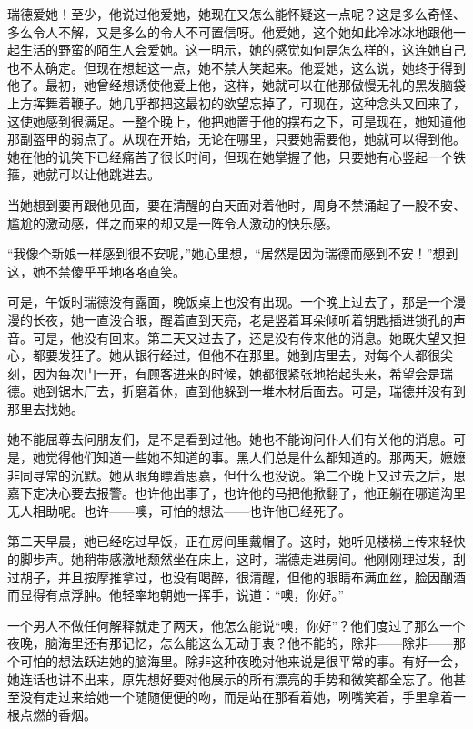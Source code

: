 \par 瑞德爱她！至少，他说过他爱她，她现在又怎么能怀疑这一点呢？这是多么奇怪、多么令人不解，又是多么的令人不可置信呀。他爱她，这个她如此冷冰冰地跟他一起生活的野蛮的陌生人会爱她。这一明示，她的感觉如何是怎么样的，这连她自己也不太确定。但现在想起这一点，她不禁大笑起来。他爱她，这么说，她终于得到他了。最初，她曾经想诱使他爱上他，这样，她就可以在他那傲慢无礼的黑发脑袋上方挥舞着鞭子。她几乎都把这最初的欲望忘掉了，可现在，这种念头又回来了，这使她感到很满足。一整个晚上，他把她置于他的摆布之下，可是现在，她知道他那副盔甲的弱点了。从现在开始，无论在哪里，只要她需要他，她就可以得到他。她在他的讥笑下已经痛苦了很长时间，但现在她掌握了他，只要她有心竖起一个铁箍，她就可以让他跳进去。
\par 当她想到要再跟他见面，要在清醒的白天面对着他时，周身不禁涌起了一股不安、尴尬的激动感，伴之而来的却又是一阵令人激动的快乐感。
\par “我像个新娘一样感到很不安呢，”她心里想，“居然是因为瑞德而感到不安！”想到这，她不禁傻乎乎地咯咯直笑。
\par 可是，午饭时瑞德没有露面，晚饭桌上也没有出现。一个晚上过去了，那是一个漫漫的长夜，她一直没合眼，醒着直到天亮，老是竖着耳朵倾听着钥匙插进锁孔的声音。可是，他没有回来。第二天又过去了，还是没有传来他的消息。她既失望又担心，都要发狂了。她从银行经过，但他不在那里。她到店里去，对每个人都很尖刻，因为每次门一开，有顾客进来的时候，她都很紧张地抬起头来，希望会是瑞德。她到锯木厂去，折磨着休，直到他躲到一堆木材后面去。可是，瑞德并没有到那里去找她。
\par 她不能屈尊去问朋友们，是不是看到过他。她也不能询问仆人们有关他的消息。可是，她觉得他们知道一些她不知道的事。黑人们总是什么都知道的。那两天，嬷嬷非同寻常的沉默。她从眼角瞟着思嘉，但什么也没说。第二个晚上又过去之后，思嘉下定决心要去报警。也许他出事了，也许他的马把他掀翻了，他正躺在哪道沟里无人相助呢。也许——噢，可怕的想法——也许他已经死了。
\par 第二天早晨，她已经吃过早饭，正在房间里戴帽子。这时，她听见楼梯上传来轻快的脚步声。她稍带感激地颓然坐在床上，这时，瑞德走进房间。他刚刚理过发，刮过胡子，并且按摩推拿过，也没有喝醉，很清醒，但他的眼睛布满血丝，脸因酗酒而显得有点浮肿。他轻率地朝她一挥手，说道：“噢，你好。”
\par 一个男人不做任何解释就走了两天，他怎么能说“噢，你好”？他们度过了那么一个夜晚，脑海里还有那记忆，怎么能这么无动于衷？他不能的，除非——除非——那个可怕的想法跃进她的脑海里。除非这种夜晚对他来说是很平常的事。有好一会，她连话也讲不出来，原先想好要对他展示的所有漂亮的手势和微笑都全忘了。他甚至没有走过来给她一个随随便便的吻，而是站在那看着她，咧嘴笑着，手里拿着一根点燃的香烟。
